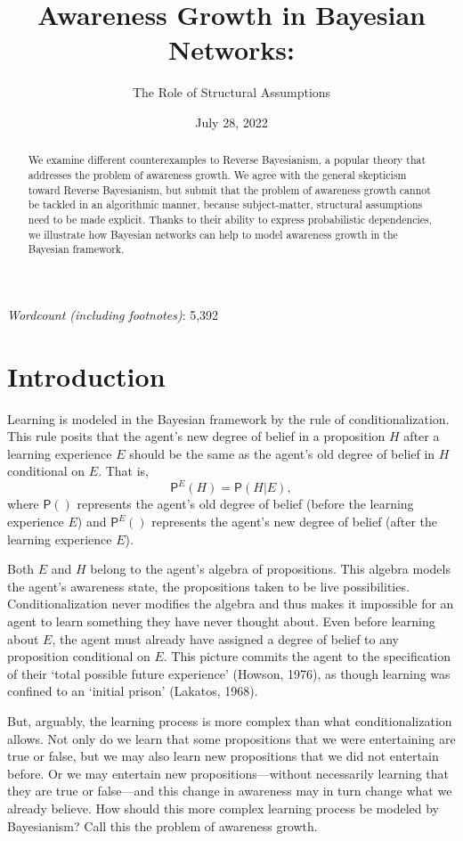 \documentclass[
  11pt,
  dvipsnames,enabledeprecatedfontcommands]{scrartcl}
\title{Awareness Growth in Bayesian Networks:}
\subtitle{The Role of Structural Assumptions}
\author{}
\date{\vspace{-2.5em}July 28, 2022}
\newcommand{\pr}[1]{\ensuremath{\mathsf{P}(#1)}}
\newcommand{\ppr}[2]{\ensuremath{\mathsf{P}^{#1}(#2)}}
\begin{document}
\maketitle

\doublespace

\emph{Wordcount (including footnotes)}: 5,392

\begin{abstract}
We examine different counterexamples to Reverse Bayesianism, a popular theory 
that addresses the problem of awareness growth. We agree with the general skepticism toward Reverse Bayesianism, but submit that the problem of awareness growth cannot be tackled in an algorithmic manner, because subject-matter, structural assumptions need to be made explicit. Thanks to their ability to express probabilistic dependencies, we illustrate how Bayesian networks can help to model awareness growth in the Bayesian framework. 
\end{abstract}

\doublespace
\linenumbers

\hypertarget{introduction}{%
\section{Introduction}\label{introduction}}

Learning is modeled in the Bayesian framework by the rule of
conditionalization. This rule posits that the agent's new degree of
belief in a proposition \(H\) after a learning experience \(E\) should
be the same as the agent's old degree of belief in \(H\) conditional on
\(E\). That is, \[\ppr{E}{H}=\pr{H \vert E},\] where \(\pr{}\)
represents the agent's old degree of belief (before the learning
experience \(E\)) and \(\ppr{E}{}\) represents the agent's new degree of
belief (after the learning experience \(E\)).

Both \(E\) and \(H\) belong to the agent's algebra of propositions. This
algebra models the agent's awareness state, the propositions taken to be
live possibilities. Conditionalization never modifies the algebra and
thus makes it impossible for an agent to learn something they have never
thought about. Even before learning about \(E\), the agent must already
have assigned a degree of belief to any proposition conditional on
\(E\). This picture commits the agent to the specification of their
`total possible future experience' (Howson, 1976), as though learning
was confined to an `initial prison' (Lakatos, 1968).

But, arguably, the learning process is more complex than what
conditionalization allows. Not only do we learn that some propositions
that we were entertaining are true or false, but we may also learn new
propositions that we did not entertain before. Or we may entertain new
propositions---without necessarily learning that they are true or
false---and this change in awareness may in turn change what we already
believe. How should this more complex learning process be modeled by
Bayesianism? Call this the problem of awareness growth.
\end{document}
